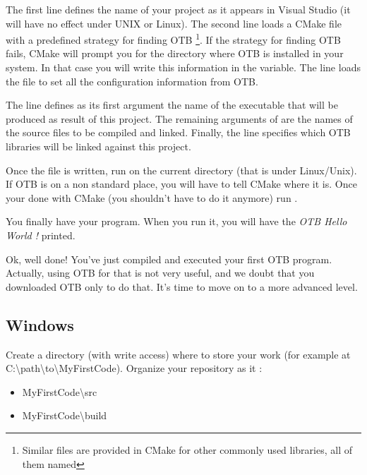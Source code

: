 The first line defines the name of your project as it appears in Visual Studio
(it will have no effect under UNIX or Linux). The second line loads a CMake file
with a predefined strategy for finding OTB \footnote{Similar files are provided
in CMake for other commonly used libraries, all of them named
}. If the strategy for finding OTB fails, CMake will prompt
you for the directory where OTB is installed in your system. In that case you
will write this information in the  variable. The line  loads the  file to set all the
configuration information from OTB.

The line  defines as its first argument the name of the
executable that will be produced as result of this project. The remaining
arguments of  are the names of the source files to be
compiled and linked.  Finally, the  line specifies
which OTB libraries will be linked against this project.



Once the file is written, run  on the current directory
(that is  under Linux/Unix). If OTB is
on a non standard place, you will have to tell CMake where it is. Once your
done with CMake (you shouldn't have to do it anymore) run .

You finally have your program. When you run it, you will have the {\em OTB Hello
World !} printed.

Ok, well done! You've just compiled and executed your first OTB program. Actually,
using OTB for that is not very useful, and we doubt that you downloaded OTB only
to do that. It's time to move on to a more advanced level.

\subsection{Windows}
\label{sec:FirstWinAppOTB}

Create a directory (with write access) where to store your work (for example at C:\textbackslash path\textbackslash to\textbackslash MyFirstCode).
Organize your repository as it :
\begin{itemize}
\item MyFirstCode\textbackslash src
\item MyFirstCode\textbackslash build
\end{itemize}

